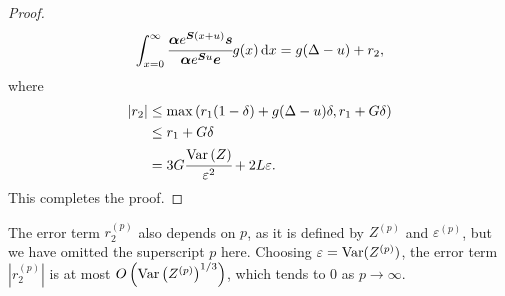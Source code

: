 \begin{proof}
\begin{align}
		\int_{x=0}^\infty \cfrac{\boldsymbol \alpha  e^{\boldsymbol{S} (x+u)} \boldsymbol s}{\boldsymbol \alpha  e^{\boldsymbol{S} u} \boldsymbol e} g(x)\, \mathrm{d} x  = g(\Delta-u) + r_2 ,
	\end{align}
	where 
	\begin{align}
		\nonumber\left|r_2 \right| 
		&\leq \max\left(r _1(1-\delta ) + g(\Delta-u)\delta , r _1 + G \delta \right) 
		\\\nonumber&\leq  r_1 + G\delta%
		\\&=3G\cfrac{\var \left(Z \right)}{\varepsilon^2} + 2L\varepsilon .
	\end{align}
	This completes the proof. 
\end{proof}

The error term \(r_2^{(p)}\) also depends on \(p\), as it is defined by \(Z^{(p)}\) and \(\varepsilon^{(p)}\), but we have omitted the superscript \(p\) here. Choosing \(\varepsilon=\mathrm{Var}(Z^{(p)})\), the error term \(|r_2^{(p)}|\) is at most \(O\left(\mathrm{Var}\left(Z^{(p)}\right)^{1/3}\right)\), which tends to 0 as \(p\to\infty\).


